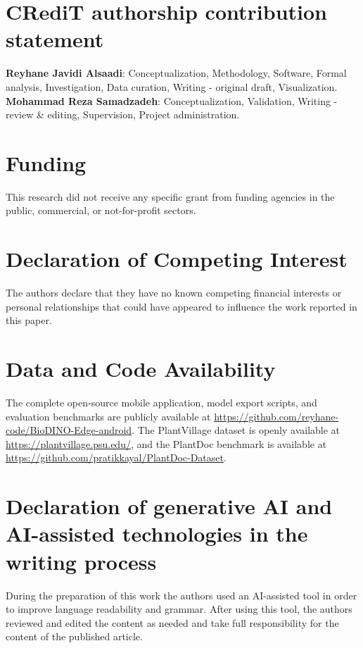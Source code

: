 \documentclass[preprint,12pt]{elsarticle}
\begin{document}
\section*{CRediT authorship contribution statement}
\textbf{Reyhane Javidi Alsaadi}: Conceptualization, Methodology, Software, Formal analysis, Investigation, Data curation, Writing - original draft, Visualization.
\textbf{Mohammad Reza Samadzadeh}: Conceptualization, Validation, Writing - review \& editing, Supervision, Project administration.

\section*{Funding}
This research did not receive any specific grant from funding agencies in the public, commercial, or not-for-profit sectors.

\section*{Declaration of Competing Interest}
The authors declare that they have no known competing financial interests or personal relationships that could have appeared to influence the work reported in this paper.

\section*{Data and Code Availability}
The complete open-source mobile application, model export scripts, and evaluation benchmarks are publicly available at \url{https://github.com/reyhane-code/BioDINO-Edge-android}. The PlantVillage dataset is openly available at \url{https://plantvillage.psu.edu/}, and the PlantDoc benchmark is available at \url{https://github.com/pratikkayal/PlantDoc-Dataset}.

\section*{Declaration of generative AI and AI-assisted technologies in the writing process}
During the preparation of this work the authors used an AI-assisted tool in order to improve language readability and grammar. After using this tool, the authors reviewed and edited the content as needed and take full responsibility for the content of the published article.



\end{document}

